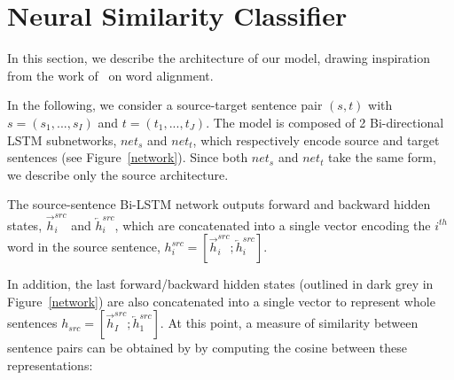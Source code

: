 \documentclass[11pt,a4paper]{article}
\begin{document}



\section{Neural Similarity Classifier}
\label{sec:similarity}

In this section, we describe the architecture of our model, drawing
inspiration from the work of~\citet{W16-2207} on word alignment.

 
In the following, we consider a source-target sentence pair $(s,t)$
with $s=(s_1,...,s_I)$ and $t=(t_1,...,t_J)$. The model is composed of
2 Bi-directional LSTM subnetworks, $net_s$ and $net_t$, which
respectively encode source and target sentences (see Figure~\ref{network}). Since both $net_s$ and $net_t$ take the same form, we describe only the source architecture.

The source-sentence Bi-LSTM network outputs forward and backward hidden states, $\overrightarrow{h}^{src}_i$ and $\overleftarrow{h}^{src}_i$, which are concatenated into a single vector encoding the $i^{th}$ word in the source sentence, 
$h^{src}_i = [ \overrightarrow{h}^{src}_i ; \overleftarrow{h}^{src}_i ]$.

In addition, the last forward/backward hidden states (outlined in dark grey in Figure~\ref{network}) are also concatenated into a single vector to represent whole sentences 
$h_{src} = [ \overrightarrow{h}^{src}_I ; \overleftarrow{h}^{src}_1 ]$.
At this point, a measure of similarity between sentence pairs can be
obtained by by computing the cosine between these representations: 
\end{document}
